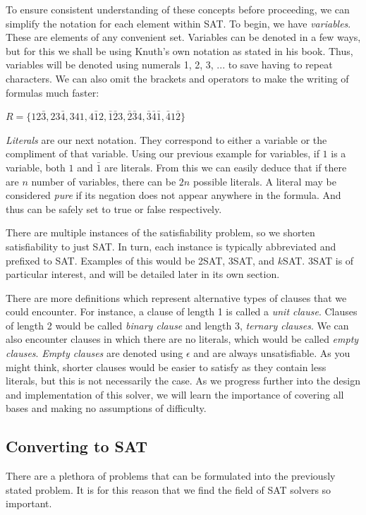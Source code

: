 \documentclass{article}
\begin{document}
To ensure consistent understanding of these concepts before proceeding, we can simplify the notation
for each element within SAT. To begin, we have \textit{variables}. These are elements of any
convenient set. Variables can be denoted in a few ways, but for this we shall be using Knuth's own
notation as stated in his book. Thus, variables will be denoted using numerals 1, 2, 3, ... to save
having to repeat characters. We can also omit the brackets and operators to make the writing of
formulas much faster:

\begin{center}
    $R = \{12\bar{3},23\bar{4},341,4\bar{1}2,\bar{1}\bar{2}3,\bar{2}\bar{3}4,\bar{3}\bar{4}\bar{1},\bar{4}1\bar{2}\}$
\end{center}

\textit{Literals} are our next notation. They correspond to either a variable or the compliment of
that variable. Using our previous example for variables, if $1$ is a variable, both $1$ and
$\bar{1}$ are literals. From this we can easily deduce that if there are $n$ number of variables,
there can be $2n$ possible literals. A literal may be considered \textit{pure} if its negation does
not appear anywhere in the formula. And thus can be safely set to true or false respectively.

There are multiple instances of the satisfiability problem, so we shorten satisfiability to just
SAT. In turn, each instance is typically abbreviated and prefixed to SAT. Examples of this would
be 2SAT, 3SAT, and $k$SAT. 3SAT is of particular interest, and will be detailed later in its own
section. 

There are more definitions which represent alternative types of clauses that we could encounter. For  instance, a clause of length 1 is called a \textit{unit clause}. Clauses of length 2
would be called \textit{binary clause} and length 3, \textit{ternary clauses}. We can also
encounter clauses in which there are no literals, which would be called \textit{empty clauses}.
\textit{Empty clauses} are denoted using $\epsilon$ and are always unsatisfiable. As you might
think, shorter clauses would be easier to satisfy as they contain less literals, but this is not
necessarily the case. As we progress further into the design and implementation of this solver, we
will learn the importance of covering all bases and making no assumptions of difficulty.

\subsection{Converting to SAT}
There are a plethora of problems that can be formulated into the previously stated problem. It is
for this reason that we find the field of SAT solvers so important.
\end{document}
